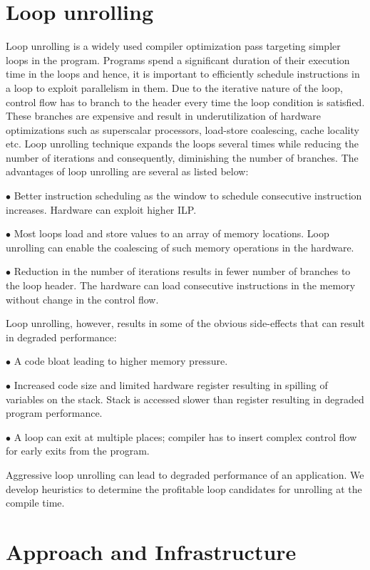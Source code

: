 \documentclass[]{sig-alternate}
\begin{document}
\section{Loop unrolling}\label{sec:unroll}
Loop unrolling is a widely used compiler optimization pass targeting simpler loops in the program. Programs spend a significant duration of their execution time in the loops and hence, it is important to efficiently schedule instructions in a loop to exploit parallelism in them. Due to the iterative nature of the loop, control flow has to branch to the header every time the loop condition is satisfied. These branches are expensive and result in underutilization of hardware optimizations such as superscalar processors, load-store coalescing, cache locality etc. Loop unrolling technique expands the loops several times while reducing the number of iterations and consequently, diminishing the number of branches. The advantages of loop unrolling are several as listed below:

\noindent $\bullet$ Better instruction scheduling as the window to schedule consecutive instruction increases. Hardware can exploit higher ILP.

\noindent $\bullet$ Most loops load and store values to an array of memory locations. Loop unrolling can enable the coalescing of such memory operations in the hardware.

\noindent $\bullet$ Reduction in the number of iterations results in fewer number of branches to the loop header. The hardware can load consecutive instructions in the memory without change in the control flow.

Loop unrolling, however, results in some of the obvious side-effects that can result in degraded performance:

\noindent $\bullet$ A code bloat leading to higher memory pressure.

\noindent $\bullet$ Increased code size and limited hardware register resulting in spilling of variables on the stack. Stack is accessed slower than register resulting in degraded program performance.

\noindent $\bullet$ A loop can exit at multiple places; compiler has to insert complex control flow for early exits from the program.

Aggressive loop unrolling can lead to degraded performance of an application. We develop heuristics to determine the profitable loop candidates for unrolling at the compile time.

\section{Approach and Infrastructure}
\label{sec:Approach}
\end{document}
